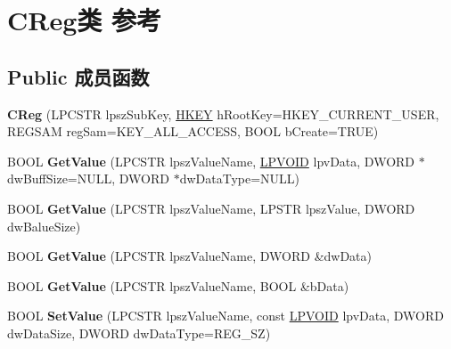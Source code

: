 \hypertarget{class_c_reg}{}\section{C\+Reg类 参考}
\label{class_c_reg}
\subsection*{Public 成员函数}
\begin{DoxyCompactItemize}
\item 
\mbox{\label{class_c_reg_a44a9a1f80ae8cc32b8b9f0c598217d49}} 
{\bfseries C\+Reg} (L\+P\+C\+S\+TR lpsz\+Sub\+Key, \hyperlink{interfacevoid}{H\+K\+EY} h\+Root\+Key=H\+K\+E\+Y\+\_\+\+C\+U\+R\+R\+E\+N\+T\+\_\+\+U\+S\+ER, R\+E\+G\+S\+AM reg\+Sam=K\+E\+Y\+\_\+\+A\+L\+L\+\_\+\+A\+C\+C\+E\+SS, B\+O\+OL b\+Create=T\+R\+UE)
\item 
\mbox{\label{class_c_reg_ad69f371abb3b867960063210736cac95}} 
B\+O\+OL {\bfseries Get\+Value} (L\+P\+C\+S\+TR lpsz\+Value\+Name, \hyperlink{interfacevoid}{L\+P\+V\+O\+ID} lpv\+Data, D\+W\+O\+RD $\ast$dw\+Buff\+Size=N\+U\+LL, D\+W\+O\+RD $\ast$dw\+Data\+Type=N\+U\+LL)
\item 
\mbox{\label{class_c_reg_a76e2e7201638c8d34790d8c0a8ca0224}} 
B\+O\+OL {\bfseries Get\+Value} (L\+P\+C\+S\+TR lpsz\+Value\+Name, L\+P\+S\+TR lpsz\+Value, D\+W\+O\+RD dw\+Balue\+Size)
\item 
\mbox{\label{class_c_reg_a21b1c4edc4aba02ddb5962ffe086fe7b}} 
B\+O\+OL {\bfseries Get\+Value} (L\+P\+C\+S\+TR lpsz\+Value\+Name, D\+W\+O\+RD \&dw\+Data)
\item 
\mbox{\label{class_c_reg_a877d5d70ad5ee032cf1b6dc22f0692ca}} 
B\+O\+OL {\bfseries Get\+Value} (L\+P\+C\+S\+TR lpsz\+Value\+Name, B\+O\+OL \&b\+Data)
\item 
\mbox{\label{class_c_reg_a28abb60e563c7b5360c497f900a0fc5e}} 
B\+O\+OL {\bfseries Set\+Value} (L\+P\+C\+S\+TR lpsz\+Value\+Name, const \hyperlink{interfacevoid}{L\+P\+V\+O\+ID} lpv\+Data, D\+W\+O\+RD dw\+Data\+Size, D\+W\+O\+RD dw\+Data\+Type=R\+E\+G\+\_\+\+SZ)
\item 
\mbox{\label{class_c_reg_a060ca69cf3f15761a5543aff480b0d9c}} 

\end{DoxyCompactItemize}
